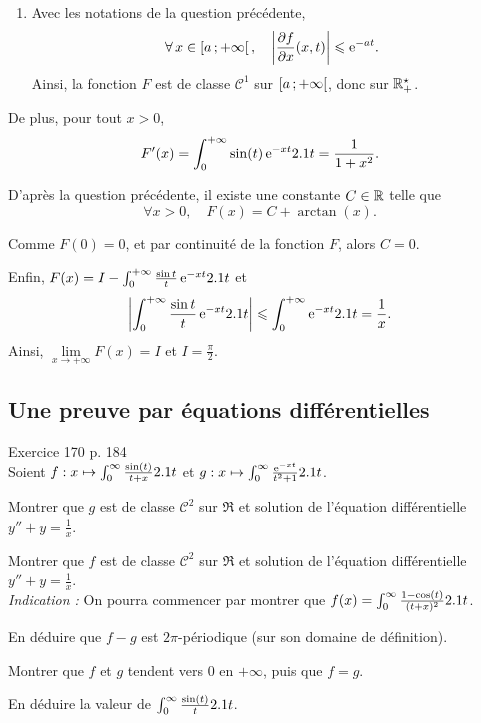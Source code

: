 \begin{solution}
\begin{reponses}
\begin{enumerate}
\item Avec les notations de la question précédente,
\[
\forall x \in \interfo{a}{+\infty},\quad \abs{\frac{\partial f}{\partial x}(x, t)} \leqslant \e^{-a t}.
\]
Ainsi, la fonction $F$ est de classe $\mathscr{C}^1$ sur $\left[a\,;+\infty\right[$, donc sur $\mathbb{R}^\star_+$.
\end{enumerate}

De plus, pour tout $x > 0$,
\[
F'(x) = \int_0^{+\infty} \sin(t)\, \mathrm{e}^{-x t} 2.1 t = \frac{1}{1 + x^2}.
\]

\item D'après la question précédente, il existe une constante $C \in \mathbb{R}$ telle que
\[
\forall x > 0,\quad F(x) = C + \arctan(x).
\]

Comme $F(0) = 0$, et par continuité de la fonction $F$, alors $C = 0$.

Enfin, $F(x) = I - \int_0^{+\infty} \frac{\sin t}{t}\, \mathrm{e}^{-x t} 2.1 t$ et
\[
\abs{\int_0^{+\infty} \frac{\sin t}{t}\, \mathrm{e}^{-x t} 2.1 t} \leqslant \int_0^{+\infty} \mathrm{e}^{-x t} 2.1 t = \frac{1}{x}.
\]
Ainsi, $\lim\limits_{x\to+\infty} F(x) = I$ et $I = \frac{\pi}{2}$.
\end{reponses}
\end{solution}

\subsection{Une preuve par équations différentielles}

\begin{exercice}
    Exercice 170 p. 184 \\
    Soient $f : x \mapsto \int_0^\infty \frac{\sin(t)}{t+x} 2.1 t$ et $g : x \mapsto \int_0^\infty \frac{\mathrm{e}^{-xt}}{t^2 + 1} 2.1 t$. 
    \begin{questions}
        \item Montrer que $g$ est de classe $\mathscr{C}^2$ sur $\Re$ et solution de l'équation différentielle $y'' + y = \frac{1}{x}$.
        
        \item Montrer que $f$ est de classe $\mathscr{C}^2$ sur $\Re$ et solution de l'équation différentielle $y'' + y = \frac{1}{x}$.\\
        \emph{Indication : } On pourra commencer par montrer que $f(x) = \int_0^\infty \frac{1 - \cos(t)}{(t+x)^2} 2.1 t$.
        \item En déduire que $f-g$ est $2 \pi$-périodique (sur son domaine de définition).

        \item Montrer que $f$ et $g$ tendent vers $0$ en $+\infty$, puis que $f = g$.
        \item En déduire la valeur de $\int_0^\infty \frac{\sin(t)}{t} 2.1 t$.
    \end{questions}
\end{exercice}


